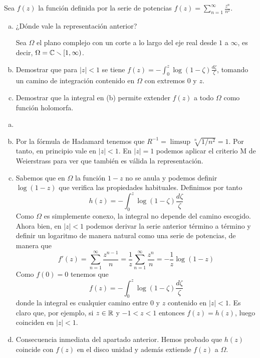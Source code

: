\documentclass[twoside]{article}
\begin{document}
\newpage
\begin{ejercicio}{2}
Sea $f(z)$ la función definida  por la serie de potencias
$\displaystyle{f(z)=\sum_{n=1}^\infty \frac{z^n}{n^2}}$.
\begin{enumerate}[a)]
\item ¿Dónde vale la representación anterior?

Sea $\Omega$ el plano complejo con un corte a lo largo del eje real desde $1$ a $\infty$, es decir,
$\Omega=\mathbb{C}\smallsetminus[1,\infty)$. 

\item Demostrar que para $|z|<1$ se tiene 
$\displaystyle{f(z)=-\int_0^z \log(1-\zeta)\frac{d\zeta}{\zeta}}$,
tomando un camino de integración contenido en $\Omega$ con extremos $0$ y $z$. 
\item  Demostrar que la integral en (b) permite extender $f(z)$ a todo $\Omega$ como función 
holomorfa.
\end{enumerate}
\end{ejercicio}
\begin{solucion}
\begin{enumerate}[a)]
\item[]
\item Por la fórmula de Hadamard tenemos que $R^{-1} = \limsup \sqrt[n]{1/n^2} = 1$. Por tanto, en principio vale en $|z|<1$. En $|z|=1$ podemos aplicar el criterio M de Weierstrass para ver que también es válida la representación.
\item Sabemos que en $\Omega$ la función $1-z$ no se anula y podemos definir $\log(1-z)$ que verifica las propiedades habituales. Definimos por tanto 
$$
h(z)=-\int_0^{z}\log(1-\zeta)\frac{d\zeta}{\zeta}
$$
Como $\Omega$ es simplemente conexo, la integral no depende del camino escogido. Ahora bien, en $|z|<1$ podemos derivar la serie anterior término a término y definir un logaritmo de manera natural como una serie de potencias, de manera que
$$
f'(z)=\sum_{n=1}^\infty \frac{z^{n-1}}{n} = \frac{1}{z}\sum_{n=1}^\infty \frac{z^{n}}{n} = -\frac{1}{z}\log(1-z)
$$
Como $f(0)=0$ tenemos que
$$
f(z)=-\int_0^{z}\log(1-\zeta)\frac{d\zeta}{\zeta}
$$
donde la integral es cualquier camino entre $0$ y $z$ contenido en $|z|<1$. Es claro que, por ejemplo, si $z\in \mathbb{R}$ y $-1<z<1$ entonces $f(z)=h(z)$, luego coinciden en $|z|<1$. 
\item Consecuencia inmediata del apartado anterior. Hemos probado que $h(z)$ coincide con $f(z)$ en el disco unidad y además extiende $f(z)$ a $\Omega$.
\end{enumerate}
\end{solucion}
\end{document}
